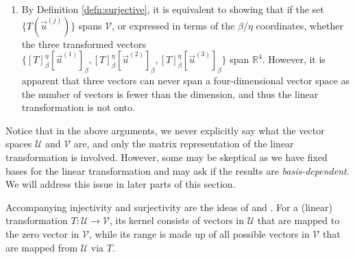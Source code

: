 \begin{solution}
\begin{enumerate}[label=(\alph*)]
\begin{align*}
    &\to 
    \left[\begin{array}{@{\,}wc{10pt}wc{10pt}wc{10pt}|wc{10pt}@{\,}}
    1 & -1 & 0 & 0 \\
    0 & 1 & 1 & 0\\
    0 & 0 & 1 & 0\\
    0 & 0 & -2 & 0
    \end{array}\right] & 
    -\frac{1}{2}R_3 \to R_3 \\
    &\to 
    \left[\begin{array}{@{\,}wc{10pt}wc{10pt}wc{10pt}|wc{10pt}@{\,}}
    1 & -1 & 0 & 0 \\
    0 & 1 & 1 & 0\\
    0 & 0 & 1 & 0\\
    0 & 0 & 0 & 0
    \end{array}\right] & 
    R_4 + 2R_3 \to R_4
    \end{align*}
    As every column in this homogeneous system contains a pivot, it demonstrates that $[T]_\beta^\eta[\vec{u}]_\beta = \textbf{0}$ indeed only has the trivial solution $[\vec{u}]_\beta = \textbf{0}$, and therefore the linear transformation in question is one-to-one.
    \item By Definition \ref{defn:surjective}, it is equivalent to showing that if the set $\{T(\vec{u}^{(j)})\}$ spans $\mathcal{V}$, or expressed in terms of the $\mathcal{\beta}$/$\mathcal{\eta}$ coordinates, whether the three transformed vectors $\{[T]_\beta^\eta[\vec{u}^{(1)}]_\beta, [T]_\beta^\eta[\vec{u}^{(2)}]_\beta, [T]_\beta^\eta[\vec{u}^{(3)}]_\beta\}$ span $\mathbb{R}^4$. However, it is apparent that three vectors can never span a four-dimensional vector space as the number of vectors is fewer than the dimension, and thus the linear transformation is not onto.
\end{enumerate}
Notice that in the above arguments, we never explicitly say what the vector spaces $\mathcal{U}$ and $\mathcal{V}$ are, and only the matrix representation of the linear transformation is involved. However, some may be skeptical as we have fixed bases for the linear transformation and may ask if the results are \textit{basis-dependent}. We will address this issue in later parts of this section.
\end{solution}
Accompanying injectivity and surjectivity are the ideas of  and . For a (linear) transformation $T: \mathcal{U} \to \mathcal{V}$, its kernel consists of vectors in $\mathcal{U}$ that are mapped to the zero vector in $\mathcal{V}$, while its range is made up of all possible vectors in $\mathcal{V}$ that are mapped from $\mathcal{U}$ via $T$.
